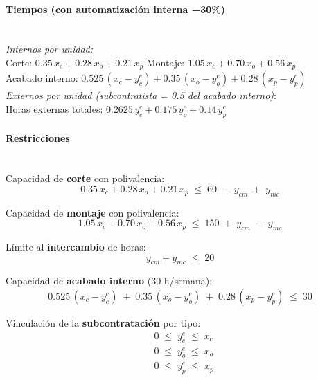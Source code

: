 \paragraph{Tiempos (con automatización interna −30\%)}\mbox{}\\
\emph{Internos por unidad:}\\
\hspace*{1em}Corte: $0.35\,x_c + 0.28\,x_o + 0.21\,x_p$ \quad
Montaje: $1.05\,x_c + 0.70\,x_o + 0.56\,x_p$ \\
\hspace*{1em}Acabado interno: $0.525\,(x_c - y_c^{e}) + 0.35\,(x_o - y_o^{e}) + 0.28\,(x_p - y_p^{e})$\\
\emph{Externos por unidad (subcontratista = 0.5 del acabado interno)}:\\
\hspace*{1em}Horas externas totales: $0.2625\,y_c^{e} + 0.175\,y_o^{e} + 0.14\,y_p^{e}$

\paragraph{Restricciones}\mbox{}\\
Capacidad de \textbf{corte} con polivalencia:
\begin{equation}
    0.35\,x_c + 0.28\,x_o + 0.21\,x_p \;\leq\; 60 \;-\; y_{cm} \;+\; y_{mc}
\end{equation}

Capacidad de \textbf{montaje} con polivalencia:
\begin{equation}
    1.05\,x_c + 0.70\,x_o + 0.56\,x_p \;\leq\; 150 \;+\; y_{cm} \;-\; y_{mc}
\end{equation}

Límite al \textbf{intercambio} de horas:
\begin{equation}
    y_{cm} + y_{mc} \;\leq\; 20
\end{equation}

Capacidad de \textbf{acabado interno} (30 h/semana):
\begin{equation}
    0.525\,(x_c - y_c^{e}) \;+\; 0.35\,(x_o - y_o^{e}) \;+\; 0.28\,(x_p - y_p^{e}) \;\leq\; 30
\end{equation}

Vinculación de la \textbf{subcontratación} por tipo:
\begin{align}
    & 0 \;\leq\; y_c^{e} \;\leq\; x_c \\
    & 0 \;\leq\; y_o^{e} \;\leq\; x_o \\
    & 0 \;\leq\; y_p^{e} \;\leq\; x_p 
\end{align}

